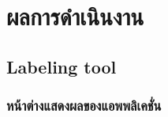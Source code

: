 \chapter{ผลการดำเนินงาน}
\section{Labeling tool}
\subsection{หน้าต่างแสดงผลของแอพพลิเคชั่น}


%

%

%
